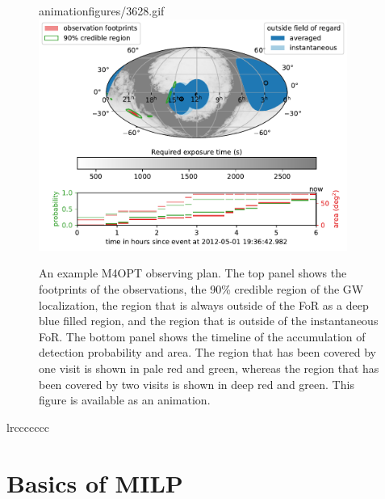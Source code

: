 \documentclass[twocolumn,times]{aastex631}
\begin{document}
\begin{figure}
    \begin{interactive}{animation}{figures/3628.gif}
        \includegraphics[width=0.9\textwidth]{figures/3628}
    \end{interactive}
    \caption{\label{fig:example}An example \ac{M4OPT} observing plan. The top panel shows the footprints of the observations, the 90\% credible region of the \ac{GW} localization, the region that is always outside of the \ac{FoR} as a deep blue filled region, and the region that is outside of the instantaneous \ac{FoR}. The bottom panel shows the timeline of the accumulation of detection probability and area. The region that has been covered by one visit is shown in pale red and green, whereas the region that has been covered by two visits is shown in deep red and green. This figure is available as an animation.}
\end{figure}

\begin{deluxetable*}{lrccccccc}
    \startdata
    
    \enddata
\end{deluxetable*}

\section{Basics of MILP}
\end{document}
